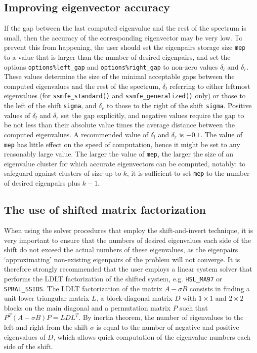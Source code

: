 \subsection{Improving eigenvector accuracy}

If the gap %
between the last computed eigenvalue 
and the rest of the spectrum is small,
then the accuracy of the corresponding eigenvector may be very low.
To prevent this from happening,
the user should set the eigenpairs storage size {\tt mep}
to a value that is larger than the number of desired eigenpairs,
and set the options 
{\tt options\%left\_gap}
and
{\tt options\%right\_gap}
to non-zero values $\delta_l$ and $\delta_r$.
These values
determine the size of the minimal acceptable gaps
between the computed eigenvalues and the rest of the spectrum,
$\delta_l$ referring to either leftmost eigenvalues
(for {\tt ssmfe\_standard()} and {\tt ssmfe\_generalized()} only)
or those to the left of the shift {\tt sigma},
and $\delta_r$
to those to the right of the shift {\tt sigma}.
Positive values of $\delta_l$ and $\delta_r$
set the gap explicitly,
and negative values
require the gap to be not less than their absolute value times
the average distance between the computed eigenvalues.
A recommended value of $\delta_l$ and $\delta_r$ is $-0.1$.
The value of {\tt mep} %
has little effect on
the speed of computation,
hence it might be set to any reasonably large value.
The larger the value of {\tt mep}, 
the larger the size of an eigenvalue cluster
for which accurate eigenvectors can be computed, notably:
to safeguard against clusters of size up to $k$,
it is sufficient to set {\tt mep} to the number of desired eigenpairs
plus $k - 1$.

\subsection{The use of shifted matrix factorization}
\label{ssmfe_expert:sec:si}

When using the solver procedures that employ the shift-and-invert technique,
it is very important to ensure that the numbers of desired eigenvalues
each side of the shift do not exceed the actual numbers of these eigenvalues,
as the eigenpairs `approximating' non-existing eigenpairs of the problem
will not converge.
It is therefore strongly recommended that the user employs 
a linear system solver that performs
the LDLT
factorization of %
the shifted system,
e.g. {\tt HSL\_MA97} or {\tt SPRAL\_SSIDS}.
The LDLT factorization of the matrix
$A - \sigma B$ consists in finding a unit lower triangular
matrix $L$, a block-diagonal matrix $D$
with $1\times 1$ and $2\times 2$ blocks on the main diagonal
and a permutation matrix $P$
such that $P^T(A - \sigma B)P = L D L^T$.
By inertia theorem,
the number of eigenvalues to the left and right from 
the shift $\sigma$
is equal to the number of negative and positive eigenvalues of $D$,
which allows quick computation of the eigenvalue numbers
each side of the shift. %


